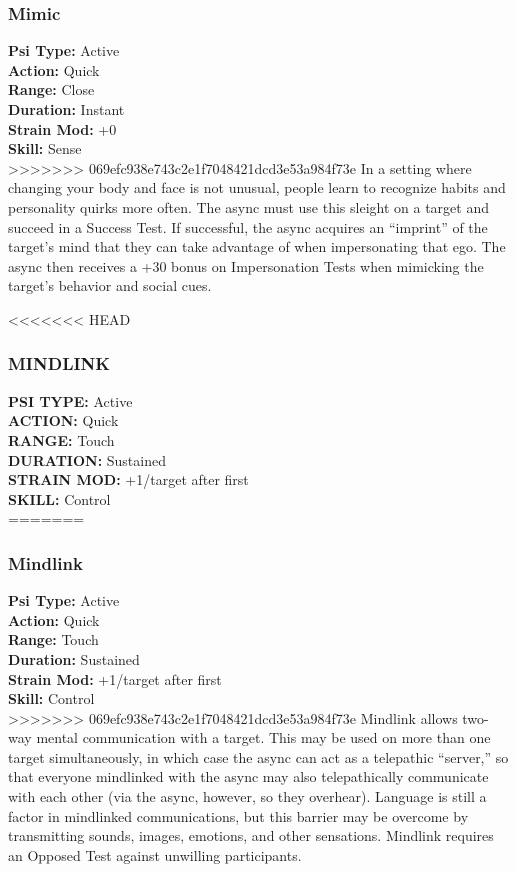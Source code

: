 \subsubsection{Mimic}
\textbf{Psi Type:} Active \\ 
\textbf{Action:} Quick \\ 
\textbf{Range:} Close \\ 
\textbf{Duration:} Instant \\
\textbf{Strain Mod:} +0 \\ 
\textbf{Skill:} Sense\\
>>>>>>> 069efc938e743c2e1f7048421dcd3e53a984f73e
In a setting where changing your body and face is
not unusual, people learn to recognize habits and
personality quirks more often. The async must use
this sleight on a target and succeed in a Success Test.
If successful, the async acquires an “imprint” of the
target’s mind that they can take advantage of when
impersonating that ego. The async then receives a +30
bonus on Impersonation Tests when mimicking the
target’s behavior and social cues.

<<<<<<< HEAD
\subsubsection{MINDLINK}
\textbf{PSI TYPE:} Active \\ 
\textbf{ACTION:} Quick \\ 
\textbf{RANGE:} Touch \\ 
\textbf{DURATION:} Sustained \\
\textbf{STRAIN MOD:} +1/target after first \\ 
\textbf{SKILL:} Control\\
=======
\subsubsection{Mindlink}
\textbf{Psi Type:} Active \\ 
\textbf{Action:} Quick \\ 
\textbf{Range:} Touch \\ 
\textbf{Duration:} Sustained \\
\textbf{Strain Mod:} +1/target after first \\ 
\textbf{Skill:} Control\\
>>>>>>> 069efc938e743c2e1f7048421dcd3e53a984f73e
Mindlink allows two-way mental communication
with a target. This may be used on more than one
target simultaneously, in which case the async can act
as a telepathic “server,” so that everyone mindlinked
with the async may also telepathically communicate
with each other (via the async, however, so they
overhear). Language is still a factor in mindlinked
communications, but this barrier may be overcome by
transmitting sounds, images, emotions, and other sensations.
Mindlink requires an Opposed Test against
unwilling participants.

